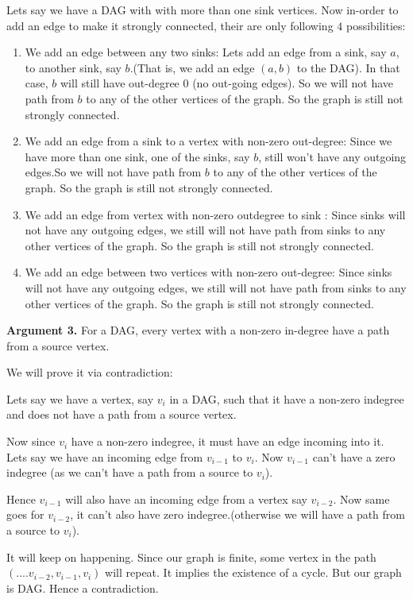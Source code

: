 \documentclass[answers]{exam}
\begin{document}
\begin{questions}
\begin{parts}
\begin{solution}
Lets say we have a DAG with with more than one sink vertices. Now in-order to add an edge to make it strongly connected, their are only following $4$ possibilities:
\begin{enumerate}
    \item We add an edge between any two sinks: Lets add an edge from a sink, say $a$, to another sink, say $b$.(That is, we add an edge $(a,b)$ to the DAG). In that case, $b$ will still have out-degree $0$ (no out-going edges). So we will not have path from $b$ to any of the other vertices of the graph. So the graph is still not strongly connected.
    \item We add an edge from a sink to a vertex with non-zero out-degree: Since we have more than one sink, one of the sinks, say $b$, still won't have any outgoing edges.So we will not have path from $b$ to any of the other vertices of the graph. So the graph is still not strongly connected.
    \item We add an edge from vertex with non-zero outdegree to sink : Since sinks will not have any outgoing edges, we still will not have path from sinks to any other vertices of the graph. So the graph is still not strongly connected.
    \item We add an edge between two vertices with non-zero out-degree: Since sinks will not have any outgoing edges, we still will not have path from sinks to any other vertices of the graph. So the graph is still not strongly connected.
\end{enumerate}

\textbf{Argument 3.} For a DAG, every vertex with a non-zero in-degree have a path from a source vertex.

We will prove it via contradiction:

Lets say we have a vertex, say $v_i$ in a DAG, such that it have a non-zero indegree and does not have a path from a source vertex.\par
Now since $v_i$ have a non-zero indegree, it must have an edge incoming into it. Lets say we have an incoming edge from $v_{i-1}$ to $v_i$. Now $v_{i-1}$ can't have a zero indegree (as we can't have a path from a source to $v_i$).\par
Hence $v_{i-1}$ will also have an incoming edge from a vertex say $v_{i-2}$. Now same goes for $v_{i-2}$, it can't also have zero indegree.(otherwise we will have a path from a source to $v_i$). \par
It will keep on happening. Since our graph is finite, some vertex in the path $(....v_{i-2},v_{i-1},v_i)$ will repeat. It implies the existence of a cycle. But our graph is  DAG. Hence a contradiction. \par


\end{solution}
\end{parts}
\end{questions}
\end{document}
